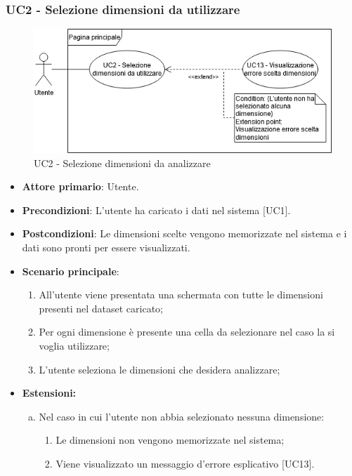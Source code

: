 \subsubsection{UC2 - Selezione dimensioni da utilizzare}
\begin{figure}[h]
\includegraphics[width=\linewidth]{section/Images/UC2.png}
\centering
\caption{UC2 - Selezione dimensioni da analizzare}
\end{figure}
\begin{itemize}
	\item \textbf{Attore primario}: Utente.
	\item \textbf{Precondizioni}: L'utente ha caricato i dati nel sistema [UC1].
	\item \textbf{Postcondizioni}: Le dimensioni scelte vengono memorizzate nel sistema e i dati sono pronti per essere visualizzati.
	\item \textbf{Scenario principale}:
		\begin{enumerate}
			\item All'utente viene presentata una schermata con tutte le dimensioni presenti nel dataset caricato;
			\item Per ogni dimensione è presente una cella da selezionare nel caso la si voglia utilizzare;
			\item L'utente seleziona le dimensioni che desidera analizzare;
		\end{enumerate}
	\item \textbf{Estensioni:}
		\begin{enumerate}[(a)]
			\item Nel caso in cui l'utente non abbia selezionato nessuna dimensione:
			\begin{enumerate}[1.]
				\item Le dimensioni non vengono memorizzate nel sistema;
				\item Viene visualizzato un messaggio d'errore esplicativo [UC13].
			\end{enumerate}
		\end{enumerate}
\end{itemize}